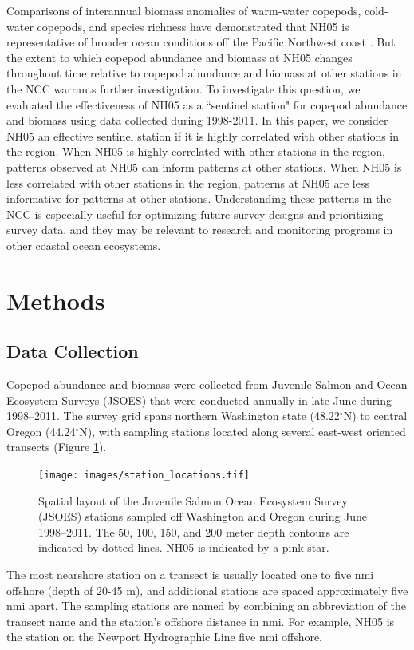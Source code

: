 \documentclass[preprint, authoryear, 12pt]{elsarticle}
\begin{document}
Comparisons of interannual biomass anomalies of warm-water copepods, cold-water copepods, and species richness have demonstrated that NH05 is representative of broader ocean conditions off the Pacific Northwest coast \citep{mackas2004comparisons, mackas2006zooplankton, tucker2015coastal}. But the extent to which copepod abundance and biomass at NH05 changes throughout time relative to copepod abundance and biomass at other stations in the NCC warrants further investigation. To investigate this question, we evaluated the effectiveness of NH05 as a ``sentinel station" for copepod abundance and biomass using data collected during 1998-2011.  In this paper, we consider NH05 an effective sentinel station if it is highly correlated with other stations in the region.  When NH05 is highly correlated with other stations in the region, patterns observed at NH05 can inform patterns at other stations. When NH05 is less correlated with other stations in the region, patterns at NH05 are less informative for patterns at other stations. Understanding these patterns in the NCC is especially useful for optimizing future survey designs and prioritizing survey data, and they may be relevant to research and monitoring programs in other coastal ocean ecosystems. 



\section{Methods}

\subsection{Data Collection}
Copepod abundance and biomass were collected from Juvenile Salmon and Ocean Ecosystem Surveys (JSOES) that were conducted annually in late June during 1998–2011.  The survey grid spans northern Washington state (48.22$^\circ$N) to central Oregon (44.24$^\circ$N), with sampling stations located along several east-west oriented transects (Figure \ref{fig:station_layout}).
\begin{figure}
\centering
  \texttt{[image: images/station\_locations.tif]}
  \caption{Spatial layout of the Juvenile Salmon Ocean Ecosystem Survey (JSOES) stations sampled off Washington and Oregon during June 1998–2011.  The 50, 100, 150, and 200 meter depth contours are indicated by dotted lines.  NH05 is indicated by a pink star.}
  \label{fig:station_layout}
\end{figure}
The most nearshore station on a transect is usually located one to five nmi offshore (depth of 20-45 m), and additional stations are spaced approximately five nmi apart.  The sampling stations are named by combining an abbreviation of the transect name and the station’s offshore distance in nmi. For example, NH05 is the station on the Newport Hydrographic Line five nmi offshore. 
\end{document}
